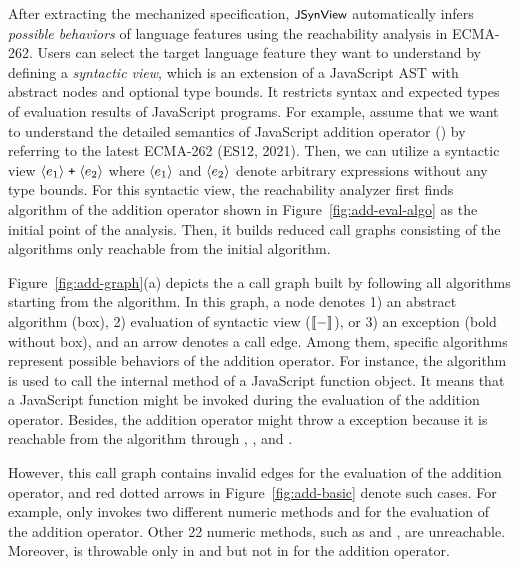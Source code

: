 After extracting the mechanized specification, $\textsf{\small JSynView}$ automatically infers
\textit{possible behaviors} of language features using the reachability analysis
in ECMA-262.  Users can select the target language feature they want to
understand by defining a \textit{syntactic view}, which is an extension of a
JavaScript AST with abstract nodes and optional type bounds.  It restricts
syntax and expected types of evaluation results of JavaScript programs.  For
example, assume that we want to understand the detailed semantics of JavaScript
addition operator (\code{+}) by referring to the latest ECMA-262 (ES12, 2021).
Then, we can utilize a syntactic view $\langle e_1 \rangle \; \texttt{+} \;
\langle e_2 \rangle$ where $\langle e_1 \rangle$ and $\langle e_2 \rangle$ denote
arbitrary expressions without any type bounds.  For this syntactic view, the
reachability analyzer first finds  algorithm of the addition
operator shown in Figure~\ref{fig:add-eval-algo} as the initial point of the
analysis.  Then, it builds reduced call graphs consisting of the algorithms only
reachable from the initial algorithm.

Figure~\ref{fig:add-graph}(a) depicts the a call graph built by following all
algorithms starting from the  algorithm.  In this graph, a
node denotes 1) an abstract algorithm (box), 2) evaluation of syntactic view
($\llbracket{-}\rrbracket$), or 3) an exception (bold without box), and an arrow denotes a call
edge.  Among them, specific algorithms represent possible behaviors of the
addition operator.  For instance, the  algorithm is used to call the
\eswrd{[[Call]]} internal method of a JavaScript function object.  It means that
a JavaScript function might be invoked during the evaluation of the addition
operator.  Besides, the addition operator might throw a 
exception because it is reachable from the  algorithm through
, , and .

However, this call graph contains invalid edges for the evaluation of the
addition operator, and red dotted arrows in Figure~\ref{fig:add-basic} denote
such cases.  For example,  only
invokes two different numeric methods  and
 for the evaluation of the addition operator.  Other 22
numeric methods, such as  and ,
are unreachable.  Moreover,  is throwable only in
 and  but not in  for the
addition operator.

